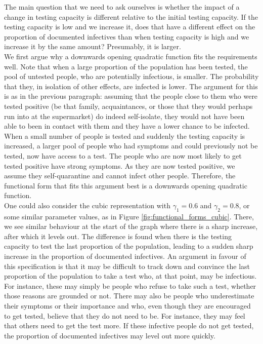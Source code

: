 \documentclass[12pt]{article}
\begin{document}
    The main question that we need to ask ourselves is whether the impact of a change in testing capacity is different relative to the initial testing capacity. If the testing capacity is low and we increase it, does that have a different effect on the proportion of documented infectives than when testing capacity is high and we increase it by the same amount? Presumably, it is larger. \\
    
    We first argue why a downwards opening quadratic function fits the requirements well. Note that when a large proportion of the population has been tested, the pool of untested people, who are potentially infectious, is smaller. The probability that they, in isolation of other effects, are infected is lower. The argument for this is as in the previous paragraph: assuming that the people close to them who were tested positive (be that family, acquaintances, or those that they would perhaps run into at the supermarket) do indeed self-isolate, they would not have been able to been in contact with them and they have a lower chance to be infected. When a small number of people is tested and suddenly the testing capacity is increased, a larger pool of people who had symptoms and could previously not be tested, now have access to a test. The people who are now most likely to get tested positive have strong symptoms. As they are now tested positive, we assume they self-quarantine and cannot infect other people. Therefore, the functional form that fits this argument best is a downwards opening quadratic function. \\
    
    One could also consider the cubic representation with $\gamma_1=0.6$ and $\gamma_2=0.8$, or some similar parameter values, as in Figure \ref{fig:functional_forms_cubic}. There, we see similar behaviour at the start of the graph where there is a sharp increase, after which it levels out. The difference is found when there is the testing capacity to test the last proportion of the population, leading to a sudden sharp increase in the proportion of documented infectives. An argument in favour of this specification is that it may be difficult to track down and convince the last proportion of the population to take a test who, at that point, may be infectious. For instance, these may simply be people who refuse to take such a test, whether those reasons are grounded or not. There may also be people who underestimate their symptoms or their importance and who, even though they are encouraged to get tested, believe that they do not need to be. For instance, they may feel that others need to get the test more. If these infective people do not get tested, the proportion of documented infectives may level out more quickly. \\
    
\end{document}
